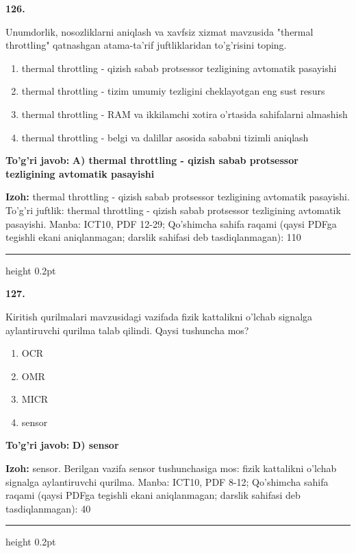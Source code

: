 \documentclass[10pt,a4paper]{article}
\begin{document}
{\bfseries\sffamily\color{ink} 126.}
\par
Unumdorlik, nosozliklarni aniqlash va xavfsiz xizmat mavzusida "thermal throttling" qatnashgan atama-ta'rif juftliklaridan to'g'risini toping.
\begin{enumerate}[label=\Alph*),leftmargin=9mm]
\item thermal throttling - qizish sabab protsessor tezligining avtomatik pasayishi
\item thermal throttling - tizim umumiy tezligini cheklayotgan eng sust resurs
\item thermal throttling - RAM va ikkilamchi xotira o'rtasida sahifalarni almashish
\item thermal throttling - belgi va dalillar asosida sababni tizimli aniqlash
\end{enumerate}
\begin{tcolorbox}[enhanced,breakable,colback=teal!4,colframe=teal!60!black,boxrule=0.45pt,arc=1.2mm,left=2.7mm,right=2.7mm,top=1.8mm,bottom=1.8mm,before skip=2mm,after skip=2mm]
{\bfseries\sffamily\color{teal}To'g'ri javob:} \textbf{A) thermal throttling - qizish sabab protsessor tezligining avtomatik pasayishi}
\par\smallskip
{\bfseries Izoh:} thermal throttling - qizish sabab protsessor tezligining avtomatik pasayishi. To'g'ri juftlik: thermal throttling - qizish sabab protsessor tezligining avtomatik pasayishi. Manba: ICT10, PDF 12-29; Qo'shimcha sahifa raqami (qaysi PDFga tegishli ekani aniqlanmagan; darslik sahifasi deb tasdiqlanmagan): 110
\end{tcolorbox}
\vspace{2mm}\hrule height 0.2pt\vspace{3mm}

{\bfseries\sffamily\color{ink} 127.}
\par
Kiritish qurilmalari mavzusidagi vazifada fizik kattalikni o'lchab signalga aylantiruvchi qurilma talab qilindi. Qaysi tushuncha mos?
\begin{enumerate}[label=\Alph*),leftmargin=9mm]
\item OCR
\item OMR
\item MICR
\item sensor
\end{enumerate}
\begin{tcolorbox}[enhanced,breakable,colback=teal!4,colframe=teal!60!black,boxrule=0.45pt,arc=1.2mm,left=2.7mm,right=2.7mm,top=1.8mm,bottom=1.8mm,before skip=2mm,after skip=2mm]
{\bfseries\sffamily\color{teal}To'g'ri javob:} \textbf{D) sensor}
\par\smallskip
{\bfseries Izoh:} sensor. Berilgan vazifa sensor tushunchasiga mos: fizik kattalikni o'lchab signalga aylantiruvchi qurilma. Manba: ICT10, PDF 8-12; Qo'shimcha sahifa raqami (qaysi PDFga tegishli ekani aniqlanmagan; darslik sahifasi deb tasdiqlanmagan): 40
\end{tcolorbox}
\vspace{2mm}\hrule height 0.2pt\vspace{3mm}
\end{document}
